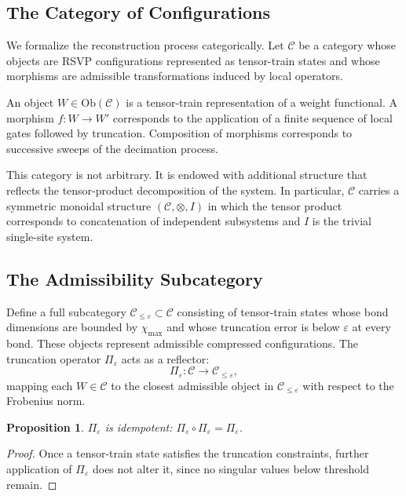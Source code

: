 \documentclass[11pt]{article}
\newtheorem{proposition}[theorem]{Proposition}
\theoremstyle{definition}
\begin{document}
\subsection{The Category of Configurations}

We formalize the reconstruction process categorically. Let $\mathcal{C}$ be a
category whose objects are RSVP configurations represented as tensor-train
states and whose morphisms are admissible transformations induced by local
operators.

An object $W \in \mathrm{Ob}(\mathcal{C})$ is a tensor-train representation of
a weight functional. A morphism $f : W \to W'$ corresponds to the application
of a finite sequence of local gates followed by truncation. Composition of
morphisms corresponds to successive sweeps of the decimation process.

This category is not arbitrary. It is endowed with additional structure that
reflects the tensor-product decomposition of the system. In particular,
$\mathcal{C}$ carries a symmetric monoidal structure $(\mathcal{C}, \otimes, I)$
in which the tensor product corresponds to concatenation of independent
subsystems and $I$ is the trivial single-site system.

\subsection{The Admissibility Subcategory}

Define a full subcategory $\mathcal{C}_{\le \varepsilon} \subset \mathcal{C}$
consisting of tensor-train states whose bond dimensions are bounded by
$\chi_{\max}$ and whose truncation error is below $\varepsilon$ at every bond.
These objects represent admissible compressed configurations. The truncation
operator $\Pi_\varepsilon$ acts as a reflector:
\begin{equation}
  \Pi_\varepsilon : \mathcal{C} \to \mathcal{C}_{\le \varepsilon},
\end{equation}
mapping each $W \in \mathcal{C}$ to the closest admissible object in
$\mathcal{C}_{\le \varepsilon}$ with respect to the Frobenius norm.

\begin{proposition}
  $\Pi_\varepsilon$ is idempotent: $\Pi_\varepsilon \circ \Pi_\varepsilon =
  \Pi_\varepsilon$.
\end{proposition}

\begin{proof}
  Once a tensor-train state satisfies the truncation constraints, further
  application of $\Pi_\varepsilon$ does not alter it, since no singular values
  below threshold remain.
\end{proof}
\end{document}
